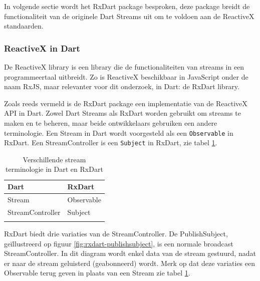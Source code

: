In volgende sectie wordt het RxDart package besproken, deze package breidt de functionaliteit van de originele Dart Streams uit om te voldoen aan de ReactiveX standaarden.

\subsubsection{ReactiveX in Dart}
\label{ch:reactivex}
De ReactiveX library is een library die de functionaliteiten van streams in een programmeertaal uitbreidt. Zo is ReactiveX beschikbaar in JavaScript onder de naam RxJS, maar relevanter voor dit onderzoek, in Dart: de RxDart library.


Zoals reeds vermeld is de RxDart package een implementatie van de ReactiveX API in Dart. Zowel Dart Streams als RxDart worden gebruikt om streams te maken en te beheren, maar beide ontwikkelaars gebruiken een andere terminologie.
Een Stream in Dart wordt voorgesteld als een \verb|Observable| in RxDart. Een StreamController is een \verb|Subject| in RxDart, zie tabel \ref{table:terminologie-rxdart-dart}.

\begin{table}[H]
    \centering
    \begin{tabular}{ll}
        \textbf{Dart}    & \textbf{RxDart} \\ \hline
        Stream           & Observable      \\
        StreamController & Subject         \\
        &                
    \end{tabular}
    \caption{Verschillende stream terminologie in Dart en RxDart \autocite{Boelens2018}}
    \label{table:terminologie-rxdart-dart}
\end{table}

RxDart biedt drie variaties van de StreamController.
\newline 
De PublishSubject, geïllustreerd op figuur \ref{fig:rxdart-publishsubject}, is een normale broadcast StreamController. In dit diagram wordt enkel data van de stream gestuurd, nadat er naar de stream geluisterd (geabonneerd) wordt.
Merk op dat deze variaties een Observable terug geven in plaats van een Stream zie tabel \ref{table:terminologie-rxdart-dart}.


